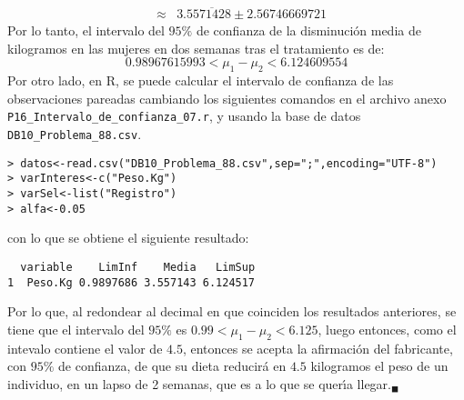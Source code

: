 \begin{solucion}
\begin{eqnarray*}
  & \approx & 3.5\overline{571428} \pm 2.56746669721
 \end{eqnarray*}
 Por lo tanto, el intervalo del $95\%$ de confianza de la disminuci\'on media de kilogramos en las mujeres en dos semanas tras el tratamiento es de:
 \begin{equation*}
  0.98967615993 < \mu_1 - \mu_2 < 6.124609554
 \end{equation*}
 Por otro lado, en R, se puede calcular el intervalo de confianza de las observaciones pareadas cambiando los siguientes comandos en el archivo anexo \texttt{P16\_Intervalo\_de\_confianza\_07.r}, y usando la base de datos \texttt{DB10\_Problema\_88.csv}.
 \begin{verbatim}
> datos<-read.csv("DB10_Problema_88.csv",sep=";",encoding="UTF-8")
> varInteres<-c("Peso.Kg")
> varSel<-list("Registro")
> alfa<-0.05
 \end{verbatim}
 \vspace{-0.5cm}
 con lo que se obtiene el siguiente resultado:
 \begin{verbatim}
  variable    LimInf    Media   LimSup
1  Peso.Kg 0.9897686 3.557143 6.124517
 \end{verbatim}
 \vspace{-0.5cm}
 Por lo que, al redondear al decimal en que coinciden los resultados anteriores, se tiene que el intervalo del $95\%$ es $0.99 < \mu_1 - \mu_2 < 6.125$, luego entonces, como el intevalo contiene el valor de $4.5$, entonces se acepta la afirmaci\'on del fabricante, con $95\%$ de confianza, de que su dieta reducir\'a en $4.5$ kilogramos el peso de un individuo, en un lapso de 2 semanas, que es a lo que se quer\'{\i}a llegar.${}_{\blacksquare}$
\end{solucion}
